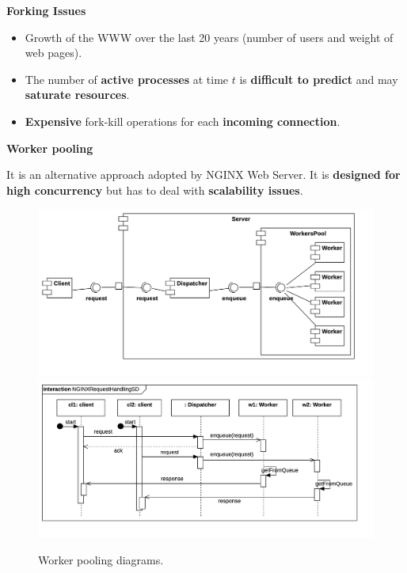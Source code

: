 \newpage

\begin{flushleft}
    \textcolor{Red2}{\textbf{ Forking Issues}}
\end{flushleft}
\begin{itemize}
    \item Growth of the WWW over the last 20 years (number of users and weight of web pages).
    
    \item The number of \textbf{active processes} at time $t$ is \textbf{difficult to predict} and may \textbf{saturate resources}.
    
    \item \textbf{Expensive} fork-kill operations for each \textbf{incoming connection}.
\end{itemize}

\newpage

\begin{flushleft}
    \large
    \textcolor{Red2}{\textbf{Worker pooling}}
\end{flushleft}
It is an alternative approach adopted by NGINX Web Server. It is \textbf{designed for high concurrency} but has to deal with \textbf{scalability issues}.

\begin{figure}[!htp]
    \centering
    \includegraphics[width=.9\textwidth]{img/worker-pooling-1.png}
    \includegraphics[width=\textwidth]{img/worker-pooling-2.png}
    \caption{Worker pooling diagrams.}
\end{figure}

